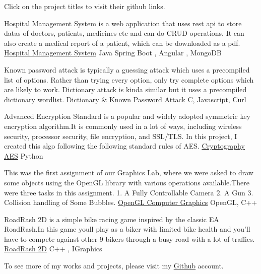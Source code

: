 \documentclass[]{awesome-cv}
\begin{document}
\vspace{-7mm}






Click on the project titles to visit their github links.
\begin{cventries}
	\cventry
	{Hospital Management System is a web application that uses rest api to store datas of doctors, patients, medicines etc and can do CRUD operations. It can also create a medical report of a patient, which can be downloaded as a pdf.}
	{\href{https://github.com/minhaz725/Hospital-Management-System}{\underline{Hospital Management System}}}
	{Java Spring Boot , Angular , MongoDB}
	{}
	{}
	
	\vspace{-5mm}
	\cventry
	{Known password attack is typically a guessing attack which uses a precompiled list of options. Rather than trying every option, only try complete options which are likely to work. Dictionary attack is kinda similar but it uses a precompiled dictionary wordlist.}
	{\href{https://github.com/minhaz725/Dictionary-And-Known-Password-Attack-On-A-Local-Server}{\underline{Dictionary \& Known Password Attack}}}
	{C, Javascript, Curl}
	{}
	{}
	
	
	\vspace{-5mm}
	\cventry
	{Advanced Encryption Standard is a popular and widely adopted symmetric key encryption algorithm.It is commonly used in a lot of ways, including wireless security, processor security, file encryption, and SSL/TLS. In this project, I created this algo following the following standard rules of AES.}
	{\href{https://github.com/minhaz725/Cryptography-AES}{\underline{Cryptography AES}}}
	{Python}
	{}
	{}
	
	
	\vspace{-5mm}
	\cventry
	{This was the first assignment of our Graphics Lab, where we were asked to draw some objects using the OpenGL library with various operations available.There were three tasks in this assignment.
		1. A Fully Controllable Camera
		2. A Gun
		3. Collision handling of Some Bubbles. }
	{\href{https://github.com/minhaz725/OpenGL-Computer-Graphics}{\underline{OpenGL Computer Graphics}}}
	{OpenGL, C++}
	{}
	{}
	
	\vspace{-5mm}
	\cventry
	{RoadRash 2D is a simple bike racing game inspired by the classic EA RoadRash.In this game you\textquotesingle{}ll play as a biker with limited bike health and you'll have to compete against other 9 bikers through a busy road with a lot of traffics.}
	{\href{https://github.com/minhaz725/RoadRash2D}{\underline{RoadRash 2D}}}
	{C++ , IGraphics}
	{}
	{}
	
	\vspace{-5mm}
	
	\cventry
	{}
	{To see more of my works and projects, please visit my \href{https://github.com/minhaz725}{\underline{Github}} account. }
	{}
	{}
	{}
	
	\vspace{-5mm}
\end{cventries}

\ 
\end{document}
